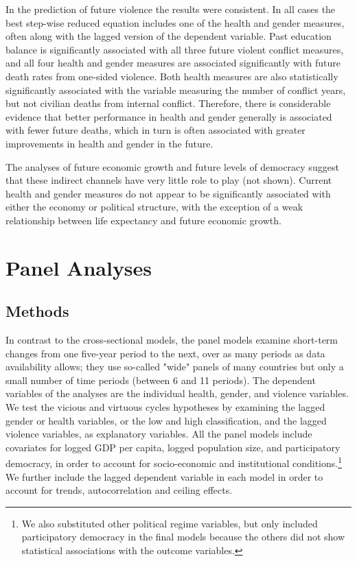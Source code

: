 \documentclass[12pt]{article}
\begin{document}
In the prediction of future violence the results were consistent. In all cases the best step-wise reduced equation includes one of the health and gender measures, often along with the lagged version of the dependent variable. Past education balance is significantly associated with all three future violent conflict measures, and all four health and gender measures are associated significantly with future death rates from one-sided violence. Both health measures are also statistically significantly associated with the variable measuring the number of conflict years, but not civilian deaths from internal conflict. Therefore, there is considerable evidence that better performance in health and gender generally is associated with fewer future deaths, which in turn is often associated with greater improvements in health and gender in the future.

The analyses of future economic growth and future levels of democracy suggest that these indirect channels have very little role to play (not shown). Current health and gender measures do not appear to be significantly associated with either the economy or political structure, with the exception of a weak relationship between life expectancy and future economic growth.

\section{Panel Analyses}

\subsection{Methods}

In contrast to the cross-sectional models, the panel models examine short-term changes from one five-year period to the next, over as many periods as data availability allows; they use so-called "wide" panels of many countries but only a small number of time periods (between 6 and 11 periods).
The dependent variables of the analyses are the individual health, gender, and violence variables.
We test the vicious and virtuous cycles hypotheses by examining the lagged gender or health variables, or the low and high classification, and the lagged violence variables, as explanatory variables.
All the panel models include covariates for logged GDP per capita, logged population size, and participatory democracy, in order to account for socio-economic and institutional conditions.\footnote{We also substituted other political regime variables, but only included participatory democracy in the final models because the others did not show statistical associations with the outcome variables.}
We further include the lagged dependent variable in each model in order to account for trends, autocorrelation and ceiling effects.
\end{document}
